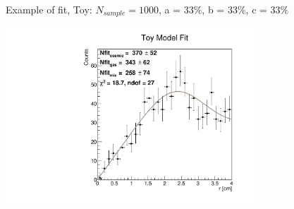 \documentclass[9pt]{beamer}
\begin{document}
\begin{frame}{Example of fit, Toy: $N_{sample} = 1000$, a = $33\%$, b = $33\%$, c = $33\%$}
\begin{center}
\includegraphics[width = 0.70\textwidth]{N1000/FitToy(33,33,33).pdf} 
\end{center}

\end{frame}
\end{document}
